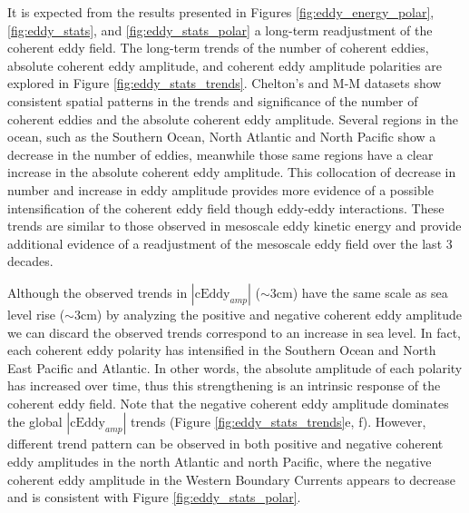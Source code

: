 \documentclass[draft,linenumbers]{agujournal2019}
\newcommand{\cEddy}{\textrm{cEddy}}
\begin{document}

	It is expected from the results presented in Figures \ref{fig:eddy_energy_polar}, \ref{fig:eddy_stats}, and  \ref{fig:eddy_stats_polar} a long-term readjustment of the coherent eddy field. 
	The long-term trends of the number of coherent eddies, absolute coherent eddy amplitude, and coherent eddy amplitude polarities are explored in Figure \ref{fig:eddy_stats_trends}. 
	Chelton's and M-M datasets show consistent spatial patterns in the trends and significance of the number of coherent eddies and the absolute coherent eddy amplitude. 
	Several regions in the ocean, such as the Southern Ocean, North Atlantic and North Pacific show a decrease in the number of eddies, meanwhile those same regions have a clear increase in the absolute coherent eddy amplitude. 
	This collocation of decrease in number and increase in eddy amplitude provides more evidence of a possible intensification of the coherent eddy field though eddy-eddy interactions. 
	These trends are similar to those observed in mesoscale eddy kinetic energy \citep{Martinez_Kinetic_2021} and provide additional evidence of a readjustment of the mesoscale eddy field over the last 3 decades. 
	
	Although the observed trends in $|\cEddy_{amp}|$ ($\sim$3cm) have the same scale as sea level rise ($\sim$3cm) by analyzing the positive and negative coherent eddy amplitude we can discard the observed trends correspond to an increase in sea level. 
	In fact, each coherent eddy polarity has intensified in the Southern Ocean and North East Pacific and Atlantic. 
	In other words, the absolute amplitude of each polarity has increased over time, thus this strengthening is an intrinsic response of the coherent eddy field. Note that the negative coherent eddy amplitude dominates the global $|\cEddy_{amp}|$ trends (Figure \ref{fig:eddy_stats_trends}e, f). However, different trend pattern can be observed in both positive and negative coherent eddy amplitudes in the north Atlantic and north Pacific, where the negative coherent eddy amplitude in the  Western Boundary Currents appears to decrease and is consistent with Figure \ref{fig:eddy_stats_polar}.
\end{document}
